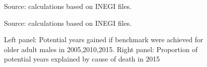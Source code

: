 \documentclass{bmcart}
\begin{document}
\begin{backmatter}
\begin{figure}[h!]

Source: calculations based on INEGI files. 
\end{figure}


\begin{figure}[h!]
\centering
\caption{Left panel: Potential years gained if benchmark were achieved for older adult males in 2005,2010,2015. Right panel: Proportion of potential years explained by cause of death in 2015 }
\label{Fig4}

Source: calculations based on INEGI files. 
\end{figure}




\end{backmatter}
\end{document}
